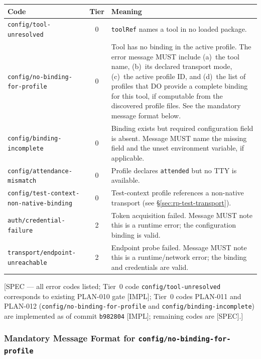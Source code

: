 \begin{center}
\begin{longtable}{p{3.5cm}cp{7.5cm}}
\toprule
\textbf{Code} & \textbf{Tier} & \textbf{Meaning} \\
\midrule
\texttt{config/tool-unresolved} & 0 &
    \texttt{toolRef} names a tool in no loaded package. \\
\texttt{config/no-binding-for-profile} & 0 &
    Tool has no binding in the active profile.  The error message MUST
    include (a)~the tool name, (b)~its declared transport mode,
    (c)~the active profile ID, and (d)~the list of profiles that DO
    provide a complete binding for this tool, if computable from the
    discovered profile files.  See the mandatory message format below. \\
\texttt{config/binding-incomplete} & 0 &
    Binding exists but required configuration field is absent.  Message
    MUST name the missing field and the unset environment variable, if
    applicable. \\
\texttt{config/attendance-mismatch} & 0 &
    Profile declares \texttt{attended} but no TTY is available. \\
\texttt{config/test-context-non-native-binding} & 0 &
    Test-context profile references a non-native transport (see
    \S\ref{sec:rp-test-transport}). \\
\texttt{auth/credential-failure} & 2 &
    Token acquisition failed.  Message MUST note this is a runtime
    error; the configuration binding is valid. \\
\texttt{transport/endpoint-unreachable} & 2 &
    Endpoint probe failed.  Message MUST note this is a runtime/network
    error; the binding and credentials are valid. \\
\bottomrule
\end{longtable}
\end{center}

[SPEC — all error codes listed; Tier~0 code \texttt{config/tool-unresolved}
corresponds to existing PLAN-010 gate [IMPL]; Tier~0 codes PLAN-011 and
PLAN-012 (\texttt{config/no-binding-for-profile} and
\texttt{config/binding-incomplete}) are implemented as of commit
\texttt{b982804} [IMPL]; remaining codes are [SPEC].]

\subsubsection{Mandatory Message Format for \texttt{config/no-binding-for-profile}}
\label{subsubsec:rp-no-binding-message}

